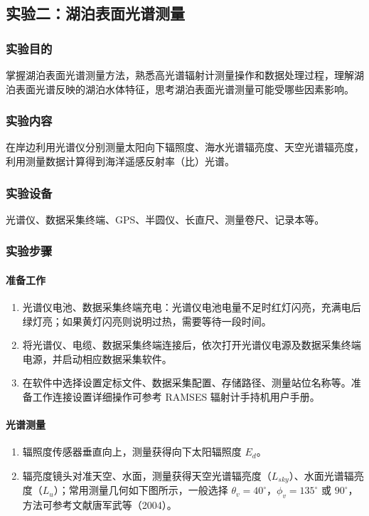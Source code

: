 \documentclass[UTF8,a4paper,12pt]{ctexart}
\begin{document}
\subsection{实验二：湖泊表面光谱测量}

\subsubsection{实验目的}
掌握湖泊表面光谱测量方法，熟悉高光谱辐射计测量操作和数据处理过程，理解湖泊表面光谱反映的湖泊水体特征，思考湖泊表面光谱测量可能受哪些因素影响。

\subsubsection{实验内容}
在岸边利用光谱仪分别测量太阳向下辐照度、海水光谱辐亮度、天空光谱辐亮度，利用测量数据计算得到海洋遥感反射率（比）光谱。

\subsubsection{实验设备}
光谱仪、数据采集终端、GPS、半圆仪、长直尺、测量卷尺、记录本等。

\subsubsection{实验步骤}
\paragraph{准备工作}
\begin{enumerate}[label=（\arabic*）]
  \item 光谱仪电池、数据采集终端充电：光谱仪电池电量不足时红灯闪亮，充满电后绿灯亮；如果黄灯闪亮则说明过热，需要等待一段时间。
  \item 将光谱仪、电缆、数据采集终端连接后，依次打开光谱仪电源及数据采集终端电源，并启动相应数据采集软件。
  \item 在软件中选择设置定标文件、数据采集配置、存储路径、测量站位名称等。准备工作连接设置详细操作可参考 RAMSES 辐射计手持机用户手册。
\end{enumerate}

\paragraph{光谱测量}
\begin{enumerate}[label=（\arabic*）,resume]
  \item 辐照度传感器垂直向上，测量获得向下太阳辐照度 \(E_d\)。
  \item 辐亮度镜头对准天空、水面，测量获得天空光谱辐亮度（\(L_{sky}\)）、水面光谱辐亮度（\(L_u\)）；常用测量几何如下图所示，一般选择 \(\theta_v=40^\circ\)，\(\phi_v=135^\circ\) 或 \(90^\circ\)，方法可参考文献唐军武等（2004）。
\end{enumerate}
\end{document}
